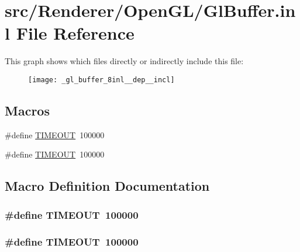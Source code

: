 \hypertarget{_gl_buffer_8inl}{\section{src/\+Renderer/\+Open\+G\+L/\+Gl\+Buffer.inl File Reference}
\label{_gl_buffer_8inl}
}
This graph shows which files directly or indirectly include this file\+:\nopagebreak
\begin{figure}[H]
\begin{center}
\leavevmode
\texttt{[image: \_gl\_buffer\_8inl\_\_dep\_\_incl]}
\end{center}
\end{figure}
\subsection*{Macros}
\begin{DoxyCompactItemize}
\item 
\#define \hyperlink{_gl_buffer_8h_a45ba202b05caf39795aeca91b0ae547e}{T\+I\+M\+E\+O\+U\+T}~100000
\item 
\#define \hyperlink{_gl_buffer_8inl_a45ba202b05caf39795aeca91b0ae547e}{T\+I\+M\+E\+O\+U\+T}~100000
\end{DoxyCompactItemize}


\subsection{Macro Definition Documentation}
\hypertarget{_gl_buffer_8h_a45ba202b05caf39795aeca91b0ae547e}{
\subsubsection[{T\+I\+M\+E\+O\+U\+T}]{\setlength{\rightskip}{0pt plus 5cm}\#define T\+I\+M\+E\+O\+U\+T~100000}}\label{_gl_buffer_8h_a45ba202b05caf39795aeca91b0ae547e}
\hypertarget{_gl_buffer_8inl_a45ba202b05caf39795aeca91b0ae547e}{
\subsubsection[{T\+I\+M\+E\+O\+U\+T}]{\setlength{\rightskip}{0pt plus 5cm}\#define T\+I\+M\+E\+O\+U\+T~100000}}\label{_gl_buffer_8inl_a45ba202b05caf39795aeca91b0ae547e}
